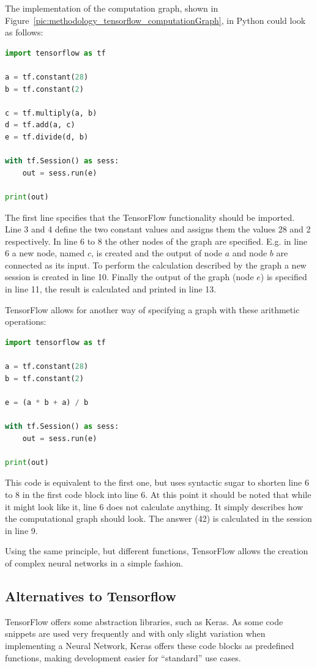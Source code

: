 The implementation of the computation graph, shown in Figure~\ref{pic:methodology_tensorflow_computationGraph}, in Python could look as follows:

\newpage

\begin{lstlisting}[language=python]
import tensorflow as tf

a = tf.constant(28)
b = tf.constant(2)

c = tf.multiply(a, b)
d = tf.add(a, c)
e = tf.divide(d, b)

with tf.Session() as sess:
    out = sess.run(e)

print(out)
\end{lstlisting}

The first line specifies that the TensorFlow functionality should be imported. Line 3 and 4 define the two constant values and assigns them the values 28 and 2 respectively. In line 6 to 8 the other nodes of the graph are specified. E.g. in line 6 a new node, named $c$, is created and the output of node $a$ and node $b$ are connected as its input. To perform the calculation described by the graph a new session is created in line 10. Finally the output of the graph (node $e$) is specified in line 11, the result is calculated and printed in line 13.

TensorFlow allows for another way of specifying a graph with these arithmetic operations:

\begin{lstlisting}[language=python]
import tensorflow as tf

a = tf.constant(28)
b = tf.constant(2)

e = (a * b + a) / b

with tf.Session() as sess:
    out = sess.run(e)

print(out)
\end{lstlisting}

This code is equivalent to the first one, but uses syntactic sugar to shorten line 6 to 8 in the first code block into line 6. At this point it should be noted that while it might look like it, line 6 does not calculate anything. It simply describes how the computational graph should look. The answer (42) is calculated in the session in line 9.

Using the same principle, but different functions, TensorFlow allows the creation of complex neural networks in a simple fashion.

\newpage

\subsection{Alternatives to Tensorflow}
TensorFlow offers some abstraction libraries, such as Keras. As some code snippets are used very frequently and with only slight variation when implementing a Neural Network, Keras offers these code blocks as predefined functions, making development easier for ``standard'' use cases.

